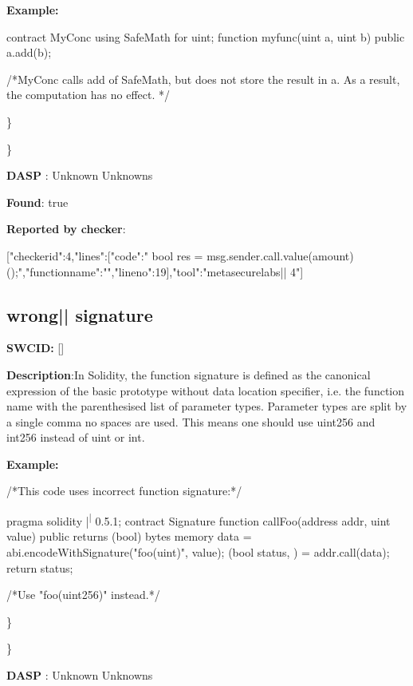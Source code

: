 \documentclass{article}
\begin{document}
\textbf{Example:} 
\begin{ffcode} 

contract MyConc{
    using SafeMath for uint;
    function my\textunderscore func(uint a, uint b) public{
        a.add(b);
    }
}

 /*MyConc calls add of SafeMath, but does not store the result in a. As a result, the computation has no effect. */ 

\end{ffcode} 
\} 

\} 

\textbf{DASP} : Unknown Unknowns

\textbf{Found}: true

\textbf{Reported by checker}: 
\begin{ffcode} 

[{"checker\textunderscore id":4,"lines":[{"code":"      bool res = msg.sender.call.value(amount)();\n","function\textunderscore name":"","line\textunderscore no":19}],"tool":"metasecurelabs|\textendash| 4"}]
\end{ffcode} 
\subsection{wrong{|\textunderscore| }signature} 
\textbf{SWC{\textunderscore }ID:} []

\textbf{Description}:In Solidity, the function signature is defined as the canonical expression of the basic prototype without data location specifier, i.e. the function name with the parenthesised list of parameter types. Parameter types are split by a single comma {\textendash} no spaces are used. This means one should use uint256 and int256 instead of uint or int.


\textbf{Example:} 
\begin{ffcode} 

 /*This code uses incorrect function signature:*/ 

pragma solidity |\textsuperscript| 0.5.1;
contract Signature {
    function callFoo(address addr, uint value) public returns (bool) {
        bytes memory data = abi.encodeWithSignature("foo(uint)", value);
        (bool status, ) = addr.call(data);
        return status;
    }
}

/*Use "foo(uint256)" instead.*/

\end{ffcode} 
\} 

\} 

\textbf{DASP} : Unknown Unknowns
\end{document}
